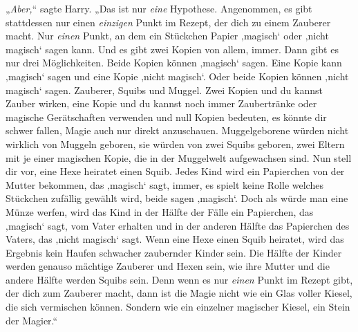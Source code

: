 „\emph{Aber,}“ sagte Harry. „Das ist nur \emph{eine} Hypothese. Angenommen, es gibt stattdessen nur einen \emph{einzigen} Punkt im Rezept, der dich zu einem Zauberer macht. Nur \emph{einen} Punkt, an dem ein Stückchen Papier ‚magisch‘ oder ‚nicht magisch‘ sagen kann. Und es gibt zwei Kopien von allem, immer. Dann gibt es nur drei Möglichkeiten. Beide Kopien können ‚magisch‘ sagen. Eine Kopie kann ‚magisch‘ sagen und eine Kopie ‚nicht magisch‘. Oder beide Kopien können ‚nicht magisch‘ sagen. Zauberer, Squibs und Muggel. Zwei Kopien und du kannst Zauber wirken, eine Kopie und du kannst noch immer Zaubertränke oder magische Gerätschaften verwenden und null Kopien bedeuten, es könnte dir schwer fallen, Magie auch nur direkt anzuschauen. Muggelgeborene würden nicht wirklich von Muggeln geboren, sie würden von zwei Squibs geboren, zwei Eltern mit je einer magischen Kopie, die in der Muggelwelt aufgewachsen sind. Nun stell dir vor, eine Hexe heiratet einen Squib. Jedes Kind wird ein Papierchen von der Mutter bekommen, das ‚magisch‘ sagt, immer, es spielt keine Rolle welches Stückchen zufällig gewählt wird, beide sagen ‚magisch‘. Doch als würde man eine Münze werfen, wird das Kind in der Hälfte der Fälle ein Papierchen, das ‚magisch‘ sagt, vom Vater erhalten und in der anderen Hälfte das Papierchen des Vaters, das ‚nicht magisch‘ sagt. Wenn eine Hexe einen Squib heiratet, wird das Ergebnis kein Haufen schwacher zaubernder Kinder sein. Die Hälfte der Kinder werden genauso mächtige Zauberer und Hexen sein, wie ihre Mutter und die andere Hälfte werden Squibs sein. Denn wenn es nur \emph{einen} Punkt im Rezept gibt, der dich zum Zauberer macht, dann ist die Magie nicht wie ein Glas voller Kiesel, die sich vermischen können. Sondern wie ein einzelner magischer Kiesel, ein Stein der Magier.“%

